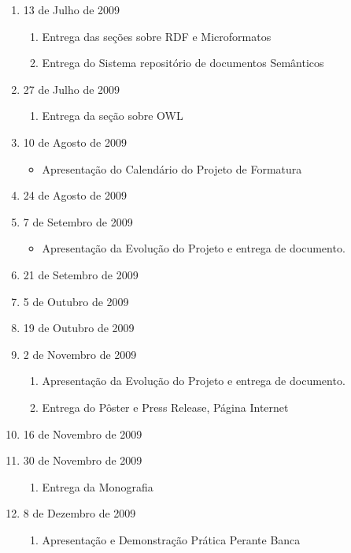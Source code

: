 \documentclass[]{article}
\begin{document}
\begin{enumerate}
  \item 13 de Julho de 2009
  \begin{enumerate}
    \item Entrega das seções sobre RDF e Microformatos
    \item Entrega do Sistema repositório de documentos Semânticos
  \end{enumerate}
  \item 27 de Julho de 2009
  \begin{enumerate}
    \item Entrega da seção sobre OWL
  \end{enumerate}
  \item 10 de Agosto de 2009
  \begin{itemize}
    \item Apresentação do Calendário do Projeto de Formatura
  \end{itemize}
  \item 24 de Agosto de 2009
  \item 7 de Setembro de 2009
  \begin{itemize}
    \item Apresentação da Evolução do Projeto e entrega de documento.
  \end{itemize}
  \item 21 de Setembro de 2009
  \item 5 de Outubro de 2009
  \item 19 de Outubro de 2009
  \item 2 de Novembro de 2009
  \begin{enumerate}
    \item Apresentação da Evolução do Projeto e entrega de documento.
    \item Entrega do Pôster e Press Release, Página Internet
  \end{enumerate}
  \item 16 de Novembro de 2009
  \item 30 de Novembro de 2009
  \begin{enumerate}
    \item Entrega da Monografia
  \end{enumerate}
  \item 8 de Dezembro de 2009
  \begin{enumerate}
    \item Apresentação e Demonstração Prática Perante Banca
  \end{enumerate}
\end{enumerate}
\end{document}
